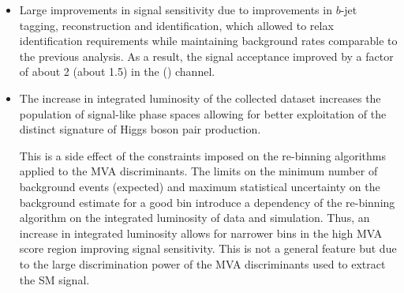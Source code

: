 \begin{itemize}

\item Large improvements in signal sensitivity due to improvements in $b$-jet
  tagging, \tauhadvis reconstruction and identification, which allowed to relax
  identification requirements while maintaining background rates comparable to
  the previous analysis. %
  As a result, the signal acceptance improved by a factor of about 2 (about 1.5)
  in the \hadhad (\lephad) channel.

\item The increase in integrated luminosity of the collected dataset increases
  the population of signal-like phase spaces allowing for better exploitation of
  the distinct signature of Higgs boson pair production.

  This is a side effect of the constraints imposed on the re-binning algorithms
  applied to the MVA discriminants. The limits on the minimum number of
  background events (expected) and maximum statistical uncertainty on the
  background estimate for a good bin introduce a dependency of the re-binning
  algorithm on the integrated luminosity of data and simulation. Thus, an
  increase in integrated luminosity allows for narrower bins in the high MVA
  score region improving signal sensitivity. This is not a general feature but
  due to the large discrimination power of the MVA discriminants used to extract
  the SM \HH signal.
\end{itemize}


